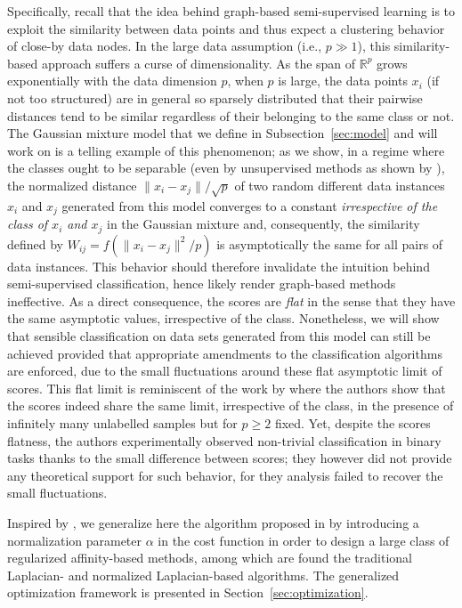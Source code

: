 \documentclass[twoside,11pt]{article}
\begin{document}
Specifically, recall that the idea behind graph-based semi-supervised learning is to exploit the similarity between data points and thus expect a clustering behavior of close-by data nodes. In the large data assumption (i.e., $p\gg1$), this similarity-based approach suffers a curse of dimensionality. As the span of $\mathbb{R}^{p}$ grows exponentially with the data dimension $p$, when $p$ is large, the data points $x_{i}$ (if not too structured) are in general so sparsely distributed that their pairwise distances tend to be similar regardless of their belonging to the same class or not. The Gaussian mixture model that we define in Subsection~\ref{sec:model} and will work on is a telling example of this phenomenon; as we show, in a regime where the classes ought to be separable (even by unsupervised methods as shown by \citealt{couillet2015kernel}), the normalized distance $\|x_{i}-x_{j}\|/\sqrt{p}$ of two random different data instances $x_{i}$ and $x_{j}$ generated from this model converges to a constant \textit{irrespective of the class of $x_{i}$ and $x_{j}$} in the Gaussian mixture and, consequently, the similarity defined by $W_{ij}=f(\|x_{i}-x_{j}\|^{2}/p)$ is asymptotically the same for all pairs of data instances. This behavior should therefore invalidate the intuition behind semi-supervised classification, hence likely render graph-based methods ineffective. As a direct consequence, the scores are \textit{flat} in the sense that they have the same asymptotic values, irrespective of the class. Nonetheless, we will show that sensible classification on data sets generated from this model can still be achieved provided that appropriate amendments to the classification algorithms are enforced, due to the small fluctuations around these flat asymptotic limit of scores. This flat limit is reminiscent of the work by \citet{nadler2009semi} where the authors show that the scores indeed share the same limit, irrespective of the class, in the presence of infinitely many unlabelled samples but for $p\geq2$ fixed. Yet, despite the scores flatness, the authors experimentally observed non-trivial classification in binary tasks thanks to the small difference between scores; they however did not provide any theoretical support for such behavior, for they analysis failed to recover the small fluctuations.

\medskip

Inspired by \citet{avrachenkov2011generalized}, we generalize here the algorithm proposed in \citet{zhu2003semi} by introducing a normalization parameter $\alpha$ in the cost function in order to design a large class of regularized affinity-based methods, among which are found the traditional Laplacian- and normalized Laplacian-based algorithms. The generalized optimization framework is presented in Section~\ref{sec:optimization}. 
\end{document}
